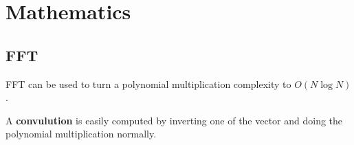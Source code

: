 \chapter{Mathematics}

\section{FFT}

	FFT can be used to turn a polynomial multiplication complexity to $O(N \log{N})$.

	A \textbf{convulution} is easily computed by inverting one of the vector and doing the polynomial multiplication normally.

